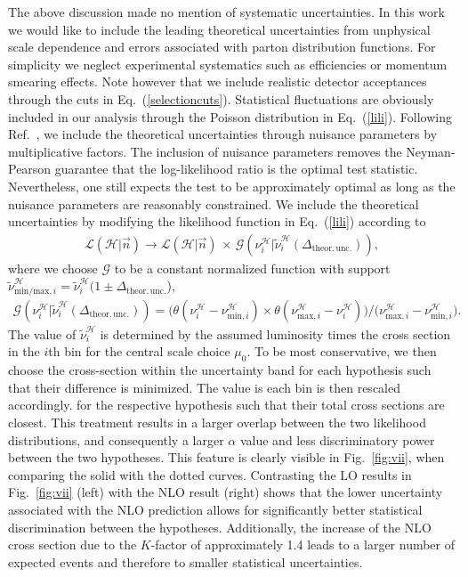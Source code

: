 \documentclass{JHEP3}
\newcommand{\be}{\begin{eqnarray}}
\newcommand{\ee}{\end{eqnarray}}
\begin{document}
The above discussion made no mention of systematic uncertainties.
In this work we would like to include the leading theoretical uncertainties from unphysical scale dependence and errors associated with parton distribution functions.
For simplicity we neglect experimental systematics such as efficiencies or momentum smearing effects.
Note however that we include realistic detector acceptances through the cuts in Eq.~(\ref{selectioncuts}).
Statistical fluctuations are obviously included in our analysis through the Poisson distribution in Eq.~(\ref{lili}).
Following Ref.~\cite{Conway:2011in}, we include the theoretical uncertainties through nuisance parameters by multiplicative factors.
The inclusion of nuisance parameters removes the Neyman-Pearson guarantee that the log-likelihood ratio is the optimal test statistic.
Nevertheless, one still expects the test to be approximately optimal as long as the nuisance parameters are reasonably constrained.
We include the theoretical uncertainties by modifying the likelihood function in Eq.~(\ref{lili}) according to
\be
  \label{errorfunctG}
  \mathcal{L}(\mathcal{H}|\vec{n}) \to \mathcal{L}(\mathcal{H}|\vec{n})  \,\times\, \mathcal{G} \left( \nu_i^\mathcal{H} | \tilde{\nu}_i^\mathcal{H}(\Delta_\mathrm{theor.\,unc.}) \right),
\ee
where we choose $\mathcal{G}$ to be a constant normalized function with support $\tilde{\nu}_{\mathrm{min/max},i}^\mathcal{H} = \tilde{\nu}_i^\mathcal{H}(1 \pm \Delta_\mathrm{theor.\,unc.}$),
\be
\label{uniuncert}
  \mathcal{G} \left( \nu_i^\mathcal{H} | \tilde{\nu}_i^\mathcal{H}(\Delta_\mathrm{theor.\,unc.}) \right) = 
  \big( \theta\left( {\nu}_i^\mathcal{H} - \nu_{\mathrm{min},i}^\mathcal{H}  \right) 
      \times  \theta\left( \nu_{\mathrm{max},i}^\mathcal{H} - {\nu}_i^\mathcal{H} \right)  \big) 
  \big/ \big( \nu_{\mathrm{max},i}^\mathcal{H} - \nu_{\mathrm{min},i}^\mathcal{H}  \big).
\ee
The value of $\tilde{\nu}_i^\mathcal{H}$ is determined by the assumed luminosity times the cross section in the $i$th bin 
for the central scale choice $\mu_0$.
To be most conservative, we then choose the cross-section within the uncertainty band for each hypothesis such that their difference is minimized. 
The value is each bin is then rescaled accordingly.
for the respective hypothesis such that their total cross sections are closest.
This treatment results in a larger overlap between the two likelihood distributions, 
and consequently a larger $\alpha$ value and less discriminatory power between the two hypotheses. 
This feature is clearly visible in Fig.~\ref{fig:vii}, when comparing the solid with the dotted curves. 
Contrasting the LO results in Fig.~\ref{fig:vii} (left) with the NLO result (right) shows that 
the lower uncertainty associated with the NLO prediction allows for significantly better statistical discrimination between the hypotheses.
Additionally, the increase of the NLO cross section due to the $K$-factor of approximately 1.4 leads to a larger number of expected events and therefore 
to smaller statistical uncertainties.
\end{document}
